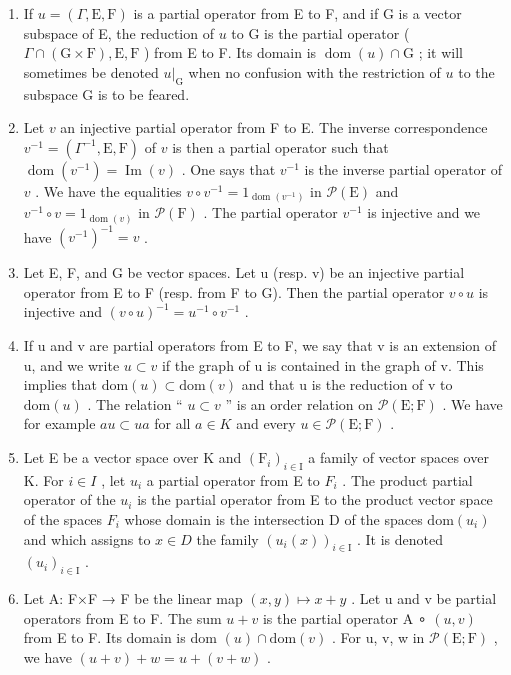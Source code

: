 \begin{enumerate}
\def\labelenumi{(\roman{enumi})}
\item
  If \(u = (\Gamma, \mathrm{E}, \mathrm{F})\) is a partial operator from E to F, and if G is a vector subspace of E, the reduction of \(u\) to G is the partial operator ( \(\Gamma \cap (\mathrm{G} \times \mathrm{F}), \mathrm{E}, \mathrm{F}\) ) from E to F. Its domain is \(\operatorname{dom}(u) \cap \mathrm{G}\) ; it will sometimes be denoted \(u|_{\mathrm{G}}\) when no confusion with the restriction of \(u\) to the subspace G is to be feared.
\item
  Let \(v\) an injective partial operator from F to E. The inverse correspondence \(v^{-1} = (\Gamma^{-1}, \mathrm{E}, \mathrm{F})\) of \(v\) is then a partial operator such that \(\operatorname{dom}(v^{-1}) = \operatorname{Im}(v)\) . One says that \(v^{-1}\) is the inverse partial operator of \(v\) . We have the equalities \(v \circ v^{-1} = 1_{\operatorname{dom}(v^{-1})}\) in \(\mathcal{P}(\mathrm{E})\) and \(v^{-1} \circ v = 1_{\operatorname{dom}(v)}\) in \(\mathcal{P}(\mathrm{F})\) . The partial operator \(v^{-1}\) is injective and we have \((v^{-1})^{-1} = v\) .
\item
  Let E, F, and G be vector spaces. Let u (resp. v) be an injective partial operator from E to F (resp. from F to G). Then the partial operator \(v \circ u\) is injective and \((v \circ u)^{-1} = u^{-1} \circ v^{-1}\) .
\item
  If u and v are partial operators from E to F, we say that v is an extension of u, and we write \(u \subset v\) if the graph of u is contained in the graph of v. This implies that \(\text{dom}(u) \subset \text{dom}(v)\) and that u is the reduction of v to \(\text{dom}(u)\) . The relation “ \(u \subset v\) ” is an order relation on \(\mathcal{P}(\text{E};\text{F})\) . We have for example \(au \subset ua\) for all \(a \in K\) and every \(u \in \mathcal{P}(\text{E};\text{F})\) .
\item
  Let E be a vector space over K and \((\mathrm{F}_{i})_{i\in\mathrm{I}}\) a family of vector spaces over K. For \(i\in I\) , let \(u_{i}\) a partial operator from E to \(F_{i}\) . The product partial operator of the \(u_{i}\) is the partial operator from E to the product vector space of the spaces \(F_{i}\) whose domain is the intersection D of the spaces \(\mathrm{dom}(u_{i})\) and which assigns to \(x\in D\) the family \((u_{i}(x))_{i\in\mathrm{I}}\) . It is denoted \((u_{i})_{i\in\mathrm{I}}\) .
\item
  Let A: F×F → F be the linear map \((x,y)\mapsto x+y\) . Let u and v be partial operators from E to F. The sum \(u+v\) is the partial operator A ∘ \((u,v)\) from E to F. Its domain is dom \((u)\cap\text{dom}(v)\) . For u, v, w in \(\mathcal{P}(\text{E};\text{F})\) , we have \((u+v)+w=u+(v+w)\) .
\end{enumerate}

